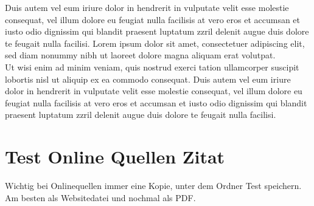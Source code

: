 	
	 
	
	Duis autem vel eum iriure dolor in hendrerit in vulputate velit esse molestie consequat, vel illum dolore eu feugiat nulla facilisis at vero eros et accumsan et iusto odio dignissim qui blandit praesent luptatum zzril delenit augue duis dolore te feugait nulla facilisi. Lorem ipsum dolor sit amet, consectetuer adipiscing elit, sed diam nonummy nibh  ut laoreet dolore magna aliquam erat volutpat.\\
	
	Ut wisi enim ad minim veniam, quis nostrud exerci tation ullamcorper suscipit lobortis nisl ut aliquip ex ea commodo consequat. Duis autem vel eum iriure dolor in hendrerit in vulputate velit esse molestie consequat, vel illum dolore eu feugiat nulla facilisis at vero eros et accumsan et iusto odio dignissim qui blandit praesent luptatum zzril delenit augue duis dolore te feugait nulla facilisi.
	
	\section{Test Online Quellen Zitat}
	Wichtig bei Onlinequellen immer eine Kopie, unter dem Ordner Test  speichern. Am besten als Websitedatei und nochmal als PDF.\cite{qs.koeln}